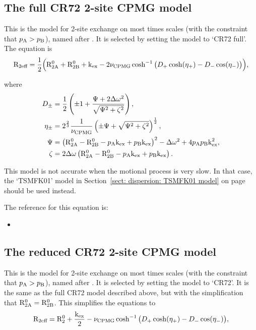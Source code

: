 
\subsection{The full CR72 2-site CPMG model}
\label{sect: dispersion: CR72 full model}

This is the model for 2-site exchange on most times scales (with the constraint that $p_\textrm{A} > p_\textrm{B}$), named after \citet{CarverRichards72}.
It is selected by setting the model to `CR72 full'.
The equation is
\begin{equation}
    \mathrm{R}_\textrm{2eff} = \frac{1}{2} \Big( \mathrm{R}_\mathrm{2A}^0 + \mathrm{R}_\mathrm{2B}^0 + \textrm{k}_\textrm{ex} - 2\nu_\textrm{CPMG}\cosh^{-1} \big( D_+\cosh(\eta_+) - D_-\cos(\eta_-) \big) \Big) ,
\end{equation}

where
\begin{align}
    D_\pm    &= \frac{1}{2} \left( \pm1 + \frac{\Psi + 2\Delta\omega^2}{\sqrt{\Psi^2 + \zeta^2}} \right) , \\
    \eta_\pm &= 2^{\frac{2}{3}}\frac{1}{\nu_\textrm{CPMG}} \left( \pm\Psi + \sqrt{\Psi^2 + \zeta^2} \right)^{\frac{1}{2}} , \\
    \Psi     &= \left( \mathrm{R}_\mathrm{2A}^0 - \mathrm{R}_\mathrm{2B}^0 - p_\textrm{A}\textrm{k}_\textrm{ex} + p_\textrm{B}\textrm{k}_\textrm{ex} \right)^2 - \Delta\omega^2 + 4p_\textrm{A}p_\textrm{B}\textrm{k}_\textrm{ex}^2 , \\
    \zeta    &= 2\Delta\omega \left( \mathrm{R}_\mathrm{2A}^0 - \mathrm{R}_\mathrm{2B}^0 - p_\textrm{A}\textrm{k}_\textrm{ex} + p_\textrm{B}\textrm{k}_\textrm{ex} \right).
\end{align}

This model is not accurate when the motional process is very slow.
In that case, the `TSMFK01' model in Section~\ref{sect: dispersion: TSMFK01 model} on page~\pageref{sect: dispersion: TSMFK01 model} should be used instead.

The reference for this equation is:
\begin{itemize}
\item {}
\end{itemize}




\subsection{The reduced CR72 2-site CPMG model}
\label{sect: dispersion: CR72 model}

This is the model for 2-site exchange on most times scales (with the constraint that $p_\textrm{A} > p_\textrm{B}$), named after \citet{CarverRichards72}.
It is selected by setting the model to `CR72'.
It is the same as the full CR72 model described above, but with the simplification that $\mathrm{R}_\mathrm{2A}^0 = \mathrm{R}_\mathrm{2B}^0$.
This simplifies the equations to
\begin{equation}
    \mathrm{R}_\textrm{2eff} = \mathrm{R}_2^0 + \frac{\textrm{k}_\textrm{ex}}{2} - \nu_\textrm{CPMG}\cosh^{-1} \big( D_+\cosh(\eta_+) - D_-\cos(\eta_-) \big) ,
\end{equation}

